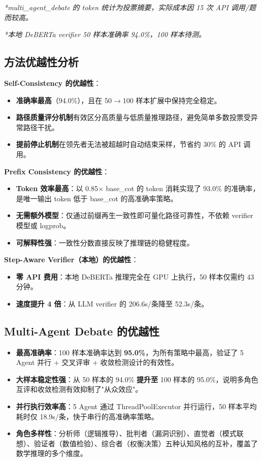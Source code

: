 \documentclass[lang=cn,a4paper,newtx]{elegantpaper}
\begin{document}
\textit{*multi\_agent\_debate 的 token 统计为投票摘要，实际成本因 15 次 API 调用/题而较高。}

\textit{*本地 DeBERTa verifier 50 样本准确率 94.0\%，100 样本待测。}

\subsection{方法优越性分析}

\textbf{Self-Consistency 的优越性}：

\begin{itemize}
  \item \textbf{准确率最高}（94.0\%），且在 50$\rightarrow$100 样本扩展中保持完全稳定。
  \item \textbf{路径质量评分机制}有效区分高质量与低质量推理路径，避免简单多数投票受异常路径干扰。
  \item \textbf{提前停止机制}在领先者无法被超越时自动结束采样，节省约 30\% 的 API 调用。
\end{itemize}

\textbf{Prefix Consistency 的优越性}：

\begin{itemize}
  \item \textbf{Token 效率最高}：以 0.85$\times$ base\_cot 的 token 消耗实现了 93.0\% 的准确率，是唯一输出 token 低于 base\_cot 的高准确率策略。
  \item \textbf{无需额外模型}：仅通过前缀再生一致性即可量化路径可靠性，不依赖 verifier 模型或 logprob。
  \item \textbf{可解释性强}：一致性分数直接反映了推理链的稳健程度。
\end{itemize}

\textbf{Step-Aware Verifier（本地）的优越性}：

\begin{itemize}
  \item \textbf{零 API 费用}：本地 DeBERTa 推理完全在 GPU 上执行，50 样本仅需约 43 分钟。
  \item \textbf{速度提升 4 倍}：从 LLM verifier 的 206.6s/条降至 52.3s/条。
\end{itemize}

\subsection{Multi-Agent Debate 的优越性}

\begin{itemize}
  \item \textbf{最高准确率}：100 样本准确率达到 \textbf{95.0\%}，为所有策略中最高，验证了 5 Agent 并行 + 交叉评审 + 收敛检测设计的有效性。
  \item \textbf{大样本稳定性强}：从 50 样本的 94.0\% \textbf{提升至} 100 样本的 95.0\%，说明多角色互评和收敛检测有效抑制了"从众效应"。
  \item \textbf{并行执行效率高}：5 Agent 通过 ThreadPoolExecutor 并行运行，50 样本平均耗时仅 18.9s/条，快于串行的高准确率策略。
  \item \textbf{角色多样性}：分析师（逻辑推导）、批判者（漏洞识别）、直觉者（模式联想）、验证者（数值检验）、综合者（权衡决策）五种认知风格的互补，覆盖了数学推理的多个维度。
\end{itemize}
\end{document}
